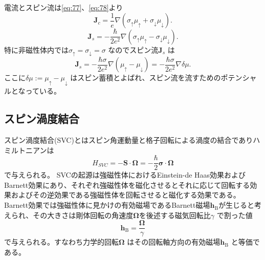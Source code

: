\documentclass[dvipdfmx]{jsreport}
\numberwithin{equation}{chapter}
\numberwithin{table}{chapter}
\begin{document}
電流とスピン流は\eqref{eq:77}、\eqref{eq:78}より
\begin{equation}
\label{eq:86}
	\bm{J}_c=\frac{1}{e}\nabla (\sigma_{\uparrow}\mu_{\uparrow}+\sigma_{\downarrow}\mu_{\downarrow})
.\end{equation}
\begin{equation}
\label{eq:87}
	\bm{J}_s=-\frac{\hbar}{2e^2}\nabla (\sigma_{\uparrow}\mu_{\uparrow}-\sigma_{\downarrow}\mu_{\downarrow})
.\end{equation}
特に非磁性体内では$\sigma_{\uparrow}=\sigma_{\downarrow}=\sigma$ なのでスピン流$\bm{J}_{s}$ は
\begin{equation}
\label{eq:88}
	\bm{J}_s=-\frac{\hbar\sigma}{2e^2}\nabla (\mu_{\uparrow}-\mu_{\downarrow})=-\frac{\hbar\sigma}{2e^2}\nabla \delta\mu
.\end{equation}
ここに$\delta\mu:=\mu_{\uparrow}-\mu_{\downarrow}$ はスピン蓄積とよばれ、スピン流を流すためのポテンシャルとなっている。
\subsection{スピン渦度結合}
スピン渦度結合(SVC)とはスピン角運動量と格子回転による渦度の結合でありハミルトニアンは
\begin{equation}
\label{eq:s1}
	H_{SVC}=-\bm{S}\cdot \bm{\Omega}=-\frac{\hbar}{2}\bm{\sigma}\cdot \bm{\Omega}
\end{equation}
で与えられる。
SVCの起源は強磁性体におけるEinstein-de Haas効果およびBarnett効果にあり、それぞれ強磁性体を磁化させるとそれに応じて回転する効果およびその逆効果である強磁性体を回転させると磁化する効果である。
Barnett効果では強磁性体に見かけの有効磁場であるBarnett磁場$\bm{h}_\text{B} $が生じると考えられ、その大きさは剛体回転の角速度$\bm{\Omega}$を後述する磁気回転比$\gamma$ で割った値
\begin{equation}
\label{eq:s2}
	\bm{h}_\text{B} =\frac{\bm{\Omega}}{\gamma}
\end{equation}
で与えられる。すなわち力学的回転$\bm{\Omega}$ はその回転軸方向の有効磁場$\bm{h}_\text{B} $ と等価である。
\end{document}
